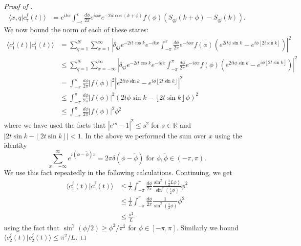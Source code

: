 \documentclass[../thesis-main/thesis-main]{subfiles}
\begin{document}
\begin{proof}[Proof of {}]
\begin{align*}
\langle x,q|c_{7}^{j}(t)\rangle & = e^{ikx}\int_{-\epsilon}^{\epsilon}\frac{d\phi}{2\pi}e^{i\phi x}e^{-2it\cos\left(k+\phi\right)}f(\phi)\left(S_{qj}(k+\phi)-S_{qj}(k)\right).
\end{align*}
We now bound the norm of each of these states:
\begin{align*}
\langle c_{1}^{j}(t)|c_{1}^{j}(t)\rangle & = \sum_{q=1}^{N}\sum_{x=1}^{\infty}\left|\delta_{qj}e^{-2it\cos k}e^{-ikx}\int_{-\pi}^{\pi}\frac{d\phi}{2\pi}e^{-i\phi x}f(\phi)\left(e^{2it\phi\sin k}-e^{i\phi\left\lfloor 2t\sin k\right\rfloor }\right)\right|^{2}\\
 & \leq \sum_{q=1}^{N}\sum_{x=-\infty}^{\infty}\left|\delta_{qj}e^{-2it\cos k}e^{-ikx}\int_{-\pi}^{\pi}\frac{d\phi}{2\pi}e^{-i\phi x}f(\phi)\left(e^{2it\phi\sin k}-e^{i\phi\left\lfloor 2t\sin k\right\rfloor }\right)\right|^{2}\\
 & = \int_{-\pi}^{\pi}\frac{d\phi}{2\pi}\left|f(\phi)\right|^{2}\left|e^{2it\phi\sin k}-e^{i\phi\left\lfloor 2t\sin k\right\rfloor }\right|^{2}\\
 & \leq \int_{-\pi}^{\pi}\frac{d\phi}{2\pi}\left|f(\phi)\right|^{2}\left(2t\phi\sin k-\left\lfloor 2t\sin k\right\rfloor \phi\right)^{2}\\
 & \leq \int_{-\pi}^{\pi}\frac{d\phi}{2\pi}\left|f(\phi)\right|^{2}\phi^{2}
\end{align*}
where we have used the facts that $|{e^{is}-1}|^{2} \leq s^{2}$
for $s\in\mathbb{R}$ and $\left|2t\sin k -\left\lfloor 2t\sin k\right\rfloor \right|<1$. In the above we performed the sum over $x$ using the identity
\[
\sum_{x=-\infty}^{\infty} e^{i(\phi-\tilde{\phi})x}=2\pi\delta(\phi-\tilde{\phi}) \text{ for } \phi,\tilde{\phi}\in (-\pi,\pi).
\]
We use this fact repeatedly in the following calculations.
Continuing, we get
\begin{align*}
\langle c_{1}^{j}(t)|c_{1}^{j}(t)\rangle & \leq \frac{1}{L} \int_{-\pi}^{\pi}\frac{d\phi}{2\pi}\frac{\sin^{2}(\frac{1}{2}L\phi)}{\sin^{2}(\frac{1}{2}\phi)}\phi^{2}\\
 & \le \frac{1}{L} \int_{-\pi}^{\pi}\frac{d\phi}{2\pi}\frac{1}{\sin^{2}(\frac{1}{2}\phi)}\phi^{2}\\
 & \leq \frac{\pi^{2}}{L}
\end{align*}
using the fact that $\sin^{2}({\phi}/{2})\geq{\phi^{2}}/{\pi^{2}}$
for $\phi\in[-\pi,\pi]$. Similarly we bound $\langle c_{2}^{j}(t)|c_{2}^{j}(t)\rangle\leq{\pi^{2}}/{L}$. 


\end{proof}
\end{document}

